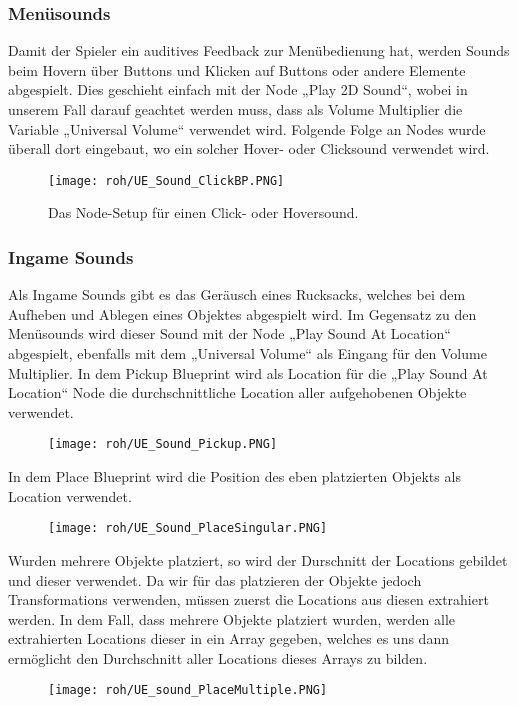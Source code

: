 \subsubsection{Menüsounds}
Damit der Spieler ein auditives Feedback zur Menübedienung hat, werden Sounds beim Hovern über Buttons und Klicken auf Buttons oder andere Elemente abgespielt. Dies geschieht einfach mit der Node „Play 2D Sound“, wobei in unserem Fall darauf geachtet werden muss, dass als Volume Multiplier die Variable „Universal Volume“ verwendet wird. Folgende Folge an Nodes wurde überall dort eingebaut, wo ein solcher Hover- oder Clicksound verwendet wird.
\begin{figure}[H]
    \centering
    \texttt{[image: roh/UE\_Sound\_ClickBP.PNG]}
    \caption{Das Node-Setup für einen Click- oder Hoversound.}
    \label{UE:Sound_ClickBP}
\end{figure}
\subsubsection{Ingame Sounds}
Als Ingame Sounds gibt es das Geräusch eines Rucksacks, welches bei dem Aufheben und Ablegen eines Objektes abgespielt wird. Im Gegensatz zu den Menüsounds wird dieser Sound mit der Node „Play Sound At Location“ abgespielt, ebenfalls mit dem „Universal Volume“ als Eingang für den Volume Multiplier. In dem Pickup Blueprint wird als Location für die „Play Sound At Location“ Node die durchschnittliche Location aller aufgehobenen Objekte verwendet.
\begin{figure}[H]
    \centering
    \texttt{[image: roh/UE\_Sound\_Pickup.PNG]}
    \label{UE:Sound_Pickup}
\end{figure}
In dem Place Blueprint wird die Position des eben platzierten Objekts als Location verwendet.
\begin{figure}[H]
    \centering
    \texttt{[image: roh/UE\_Sound\_PlaceSingular.PNG]}
    \label{UE:Sound_PlaceSingular}
\end{figure}
Wurden mehrere Objekte platziert, so wird der Durschnitt der Locations gebildet und dieser verwendet. Da wir für das platzieren der Objekte jedoch Transformations verwenden, müssen zuerst die Locations aus diesen extrahiert werden. In dem Fall, dass mehrere Objekte platziert wurden, werden alle extrahierten Locations dieser in ein Array gegeben, welches es uns dann ermöglicht den Durchschnitt aller Locations dieses Arrays zu bilden.
\begin{figure}[H]
    \centering
    \texttt{[image: roh/UE\_sound\_PlaceMultiple.PNG]}
    \label{UE:sound_PlaceMultiple}
\end{figure}

